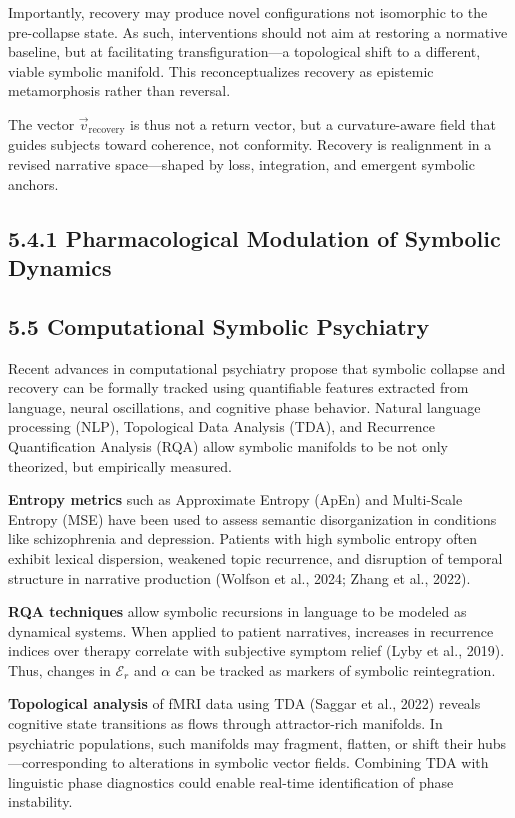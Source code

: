 Importantly, recovery may produce novel configurations not isomorphic to the pre-collapse state. As such, interventions should not aim at restoring a normative baseline, but at facilitating transfiguration—a topological shift to a different, viable symbolic manifold. This reconceptualizes recovery as epistemic metamorphosis rather than reversal.

The vector $\vec{v}_{\text{recovery}}$ is thus not a return vector, but a curvature-aware field that guides subjects toward coherence, not conformity. Recovery is realignment in a revised narrative space—shaped by loss, integration, and emergent symbolic anchors.


\subsection*{5.4.1 Pharmacological Modulation of Symbolic Dynamics}

\subsection*{5.5 Computational Symbolic Psychiatry}

Recent advances in computational psychiatry propose that symbolic collapse and recovery can be formally tracked using quantifiable features extracted from language, neural oscillations, and cognitive phase behavior. Natural language processing (NLP), Topological Data Analysis (TDA), and Recurrence Quantification Analysis (RQA) allow symbolic manifolds to be not only theorized, but empirically measured.

\textbf{Entropy metrics} such as Approximate Entropy (ApEn) and Multi-Scale Entropy (MSE) have been used to assess semantic disorganization in conditions like schizophrenia and depression. Patients with high symbolic entropy often exhibit lexical dispersion, weakened topic recurrence, and disruption of temporal structure in narrative production (Wolfson et al., 2024; Zhang et al., 2022)\cite{Wolfson2024, Zhang2022}.

\textbf{RQA techniques} allow symbolic recursions in language to be modeled as dynamical systems. When applied to patient narratives, increases in recurrence indices over therapy correlate with subjective symptom relief (Lyby et al., 2019)\cite{Lyby2019}. Thus, changes in $\mathcal{E}_r$ and $\alpha$ can be tracked as markers of symbolic reintegration.

\textbf{Topological analysis} of fMRI data using TDA (Saggar et al., 2022)\cite{Saggar2022} reveals cognitive state transitions as flows through attractor-rich manifolds. In psychiatric populations, such manifolds may fragment, flatten, or shift their hubs—corresponding to alterations in symbolic vector fields. Combining TDA with linguistic phase diagnostics could enable real-time identification of phase instability.

